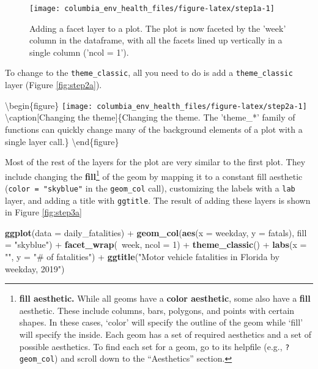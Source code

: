 \documentclass[]{tufte-book}
\newenvironment{Shaded}{}{}
\newcommand{\DataTypeTok}[1]{\textcolor[rgb]{0.56,0.13,0.00}{#1}}
\newcommand{\DecValTok}[1]{\textcolor[rgb]{0.25,0.63,0.44}{#1}}
\newcommand{\KeywordTok}[1]{\textcolor[rgb]{0.00,0.44,0.13}{\textbf{#1}}}
\newcommand{\NormalTok}[1]{#1}
\newcommand{\OperatorTok}[1]{\textcolor[rgb]{0.40,0.40,0.40}{#1}}
\newcommand{\StringTok}[1]{\textcolor[rgb]{0.25,0.44,0.63}{#1}}
\begin{document}
\begin{figure}
\texttt{[image: columbia\_env\_health\_files/figure-latex/step1a-1]} \caption[Adding a facet layer to a plot]{Adding a facet layer to a plot. The plot is now faceted by the 'week' column in the dataframe, with all the facets lined up vertically in a single column ('ncol = 1').}\label{fig:step1a}
\end{figure}

To change to the \texttt{theme\_classic}, all you need to do is add a \texttt{theme\_classic} layer
(Figure \ref{fig:step2a}).

\textbackslash{}begin\{figure\}
\texttt{[image: columbia\_env\_health\_files/figure-latex/step2a-1]} \textbackslash{}caption{[}Changing the theme{]}\{Changing the theme. The 'theme\_*' family of functions can quickly change many of the background elements of a plot with a single layer call.\}\label{fig:step2a}
\textbackslash{}end\{figure\}

Most of the rest of the layers for the plot are very similar to the first plot.
They include changing the \textbf{fill}\footnote{\textbf{fill aesthetic.} While all geoms have
  a \textbf{color aesthetic}, some also have a \textbf{fill} aesthetic. These include columns,
  bars, polygons, and points with certain shapes. In these cases, `color' will specify
  the outline of the geom while `fill' will specify the inside. Each geom has a set of
  required aesthetics and a set of possible aesthetics. To find each set for a geom,
  go to its helpfile (e.g., \texttt{?geom\_col}) and scroll down to the ``Aesthetics'' section.}
of the geom by mapping it to a constant fill
aesthetic (\texttt{color\ =\ "skyblue"} in the \texttt{geom\_col} call), customizing the labels with
a \texttt{lab} layer, and adding a title with \texttt{ggtitle}. The result of adding these layers
is shown in Figure \ref{fig:step3a}

\begin{Shaded}
\begin{Highlighting}[]
\KeywordTok{ggplot}\NormalTok{(}\DataTypeTok{data =}\NormalTok{ daily_fatalities) }\OperatorTok{+}\StringTok{ }\KeywordTok{geom_col}\NormalTok{(}\KeywordTok{aes}\NormalTok{(}\DataTypeTok{x =}\NormalTok{ weekday, }
    \DataTypeTok{y =}\NormalTok{ fatals), }\DataTypeTok{fill =} \StringTok{"skyblue"}\NormalTok{) }\OperatorTok{+}\StringTok{ }\KeywordTok{facet_wrap}\NormalTok{(}\OperatorTok{~}\NormalTok{week, }
    \DataTypeTok{ncol =} \DecValTok{1}\NormalTok{) }\OperatorTok{+}\StringTok{ }\KeywordTok{theme_classic}\NormalTok{() }\OperatorTok{+}\StringTok{ }\KeywordTok{labs}\NormalTok{(}\DataTypeTok{x =} \StringTok{""}\NormalTok{, }
    \DataTypeTok{y =} \StringTok{"# of fatalities"}\NormalTok{) }\OperatorTok{+}\StringTok{ }\KeywordTok{ggtitle}\NormalTok{(}\StringTok{"Motor vehicle fatalities in Florida by weekday, 2019"}\NormalTok{)}
\end{Highlighting}
\end{Shaded}
\end{document}

